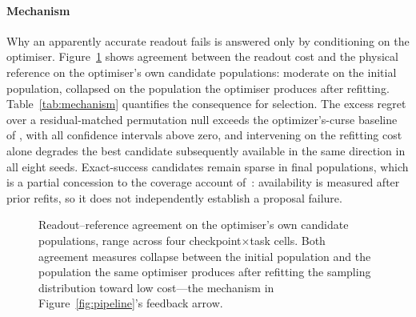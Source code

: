 \documentclass[11pt,letterpaper]{article}
\begin{document}
\paragraph{Mechanism}
Why an apparently accurate readout fails is answered only by conditioning on
the optimiser. Figure~\ref{fig:collapse} shows agreement between the readout
cost and the physical reference on the optimiser's own candidate populations:
moderate on the initial population, collapsed on the population the optimiser
produces after refitting. Table~\ref{tab:mechanism} quantifies the
consequence for selection. The excess regret over a residual-matched
permutation null exceeds the optimizer's-curse baseline of
\citet{smith2006optimizer}, with all confidence intervals above zero, and
intervening on the refitting cost alone degrades the best candidate
subsequently available in the same direction in all eight seeds. Exact-success
candidates remain sparse in final populations, which is a partial concession
to the coverage account of~\citet{imwm2026}: availability is measured after
prior refits, so it does not independently establish a proposal failure.

\begin{figure}[t]
\centering
{}
\caption{Readout--reference agreement on the optimiser's own candidate
populations, range across four checkpoint$\times$task cells. Both agreement
measures collapse between the initial population and the population the same
optimiser produces after refitting the sampling distribution toward low
cost---the mechanism in Figure~\ref{fig:pipeline}'s feedback
arrow.}\label{fig:collapse}
\end{figure}
\end{document}
